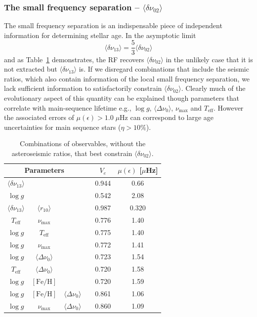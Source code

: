 \subsubsection*{The small frequency separation -- $\langle\delta\nu_{02}\rangle$}
The small frequency separation is an indispensable piece of independent information for determining stellar age. In the asymptotic limit \citep{1980ApJS...43..469T}
\begin{equation}
\langle\delta\nu_{13}\rangle = \frac{5}{3} \langle\delta\nu_{02}\rangle 
\end{equation}
and as Table~\ref{tab:d02} demonstrates, the RF recovers  ${\langle\delta\nu_{02}\rangle}$ in the unlikely case that it is not extracted but ${\langle\delta\nu_{13}\rangle}$ is.
If we disregard combinations that include the seismic ratios, which also contain information of the local small frequency separation, we lack sufficient information to satisfactorily constrain ${\langle\delta\nu_{02}\rangle}$. 
Clearly much of the evolutionary aspect of this quantity can be explained though parameters 
that correlate with main-sequence lifetime e.g.,  ${\log{} g}$, ${\langle\Delta\nu_0\rangle}$,   $\nu_{\max}$ and  $T_{\text{eff}}$. However the associated errors of ${\mu (\epsilon) > 1.0 \; \mu}$Hz can correspond to large age uncertainties for main sequence stars (${\eta > 10\%}$). 




\begin{table}
\centering
\caption{Combinations of observables, without the asteroseismic ratios, that best constrain $\langle\delta\nu_{02}\rangle$.}
    \begin{tabular}{cccccc}
    \hline
\multicolumn{3}{c}{Parameters} && $V_e$ & $\mu (\epsilon)$ [$\mu$Hz] \\ \hline \hline
$\langle\delta\nu_{13}\rangle$ &  &   &&0.944 & 0.66 \\ 
$\log{} g$ &  &   &&0.542 & 2.08 \\ 
$\langle\delta\nu_{13}\rangle$ &  $\langle r_{10}\rangle$  &   &&0.987 & 0.320 \\ 
$T_{\text{eff}}$     & $\nu_{\max}$&     &&0.776  & 1.40\\
$\log{} g$     &  $T_{\text{eff}}$&                 & &0.775  & 1.40\\
$\log{} g$     &$\nu_{\max}$ &               &&0.772  & 1.41\\
$\log{} g$     &$\langle\Delta\nu_0\rangle$ &               &&0.723  & 1.54\\
$T_{\text{eff}}$     & $\langle\Delta\nu_0\rangle$&     &&0.720  & 1.58\\
$\log{} g$ & $[\text{Fe/H}]$ &  && 0.720 & 1.59 \\
$\log{} g$ & $[\text{Fe/H}]$ & $\langle\Delta\nu_0\rangle$ && 0.861 & 1.06 \\
$\log{} g$ & $\nu_{\max}$ & $\langle\Delta\nu_0\rangle$ && 0.860 & 1.09 \\
\hline
    \end{tabular}
    \label{tab:d02}
\end{table}




